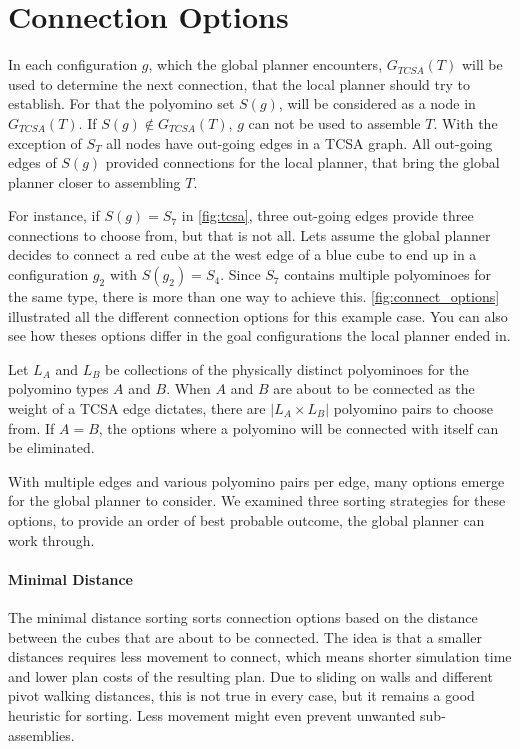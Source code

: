 \section{Connection Options}
\label{sec:connect_options}

In each configuration $g$, which the global planner encounters, $G_{TCSA}(T)$ will be used to determine the next connection, that the local planner should try to establish.
For that the polyomino set $S(g)$, will be considered as a node in $G_{TCSA}(T)$.
If $S(g) \notin G_{TCSA}(T)$, $g$ can not be used to assemble $T$.
With the exception of $S_T$ all nodes have out-going edges in a TCSA graph.
All out-going edges of $S(g)$ provided connections for the local planner, that bring the global planner closer to assembling $T$.

For instance, if $S(g) = S_7$ in \autoref{fig:tcsa}, three out-going edges provide three connections to choose from, but that is not all.
Lets assume the global planner decides to connect a red cube at the west edge of a blue cube to end up in a configuration $g_2$ with $S(g_2) = S_4$.
Since $S_7$ contains multiple polyominoes for the same type, there is more than one way to achieve this.
\autoref{fig:connect_options} illustrated all the different connection options for this example case.
You can also see how theses options differ in the goal configurations the local planner ended in.

Let $L_A$ and $L_B$ be collections of the physically distinct polyominoes for the polyomino types $A$ and $B$.
When $A$ and $B$ are about to be connected as the weight of a TCSA edge dictates, there are $\left| L_A \times L_B \right|$ polyomino pairs to choose from.
If $A = B$, the options where a polyomino will be connected with itself can be eliminated.

With multiple edges and various polyomino pairs per edge, many options emerge for the global planner to consider.
We examined three sorting strategies for these options, to provide an order of best probable outcome, the global planner can work through. 

\paragraph{Minimal Distance}

The minimal distance sorting sorts connection options based on the distance between the cubes that are about to be connected.
The idea is that a smaller distances requires less movement to connect, which means shorter simulation time and lower plan costs of the resulting plan.
Due to sliding on walls and different pivot walking distances, this is not true in every case, but it remains a good heuristic for sorting.
Less movement might even prevent unwanted sub-assemblies.

